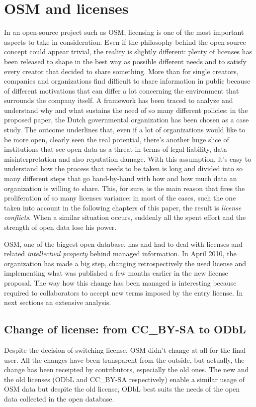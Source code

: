 \section{OSM and licenses}
In an open-source project such as OSM, licensing is one of the most important aspects to take in consideration.
Even if the philosophy behind the open-source concept could appear trivial, the reality is slightly different: plenty of licenses has been released to shape in the best way as possible different needs and to satisfy every creator that decided to share something.
More than for single creators, companies and organizations find difficult to share information in public because of different motivations that can differ a lot concerning the environment that surrounds the company itself.
A framework has been traced to analyze and understand why and what sustains the need of so many different policies: in the proposed paper\cite{zuiderwijk2014open}, the Dutch governmental organization has been chosen as a case study.
The outcome underlines that, even if a lot of organizations would like to be more open, clearly seen the real potential, there's another huge slice of institutions that see open data as a threat in terms of legal liability, data misinterpretation and also reputation damage.
With this assumption, it's easy to understand how the process that needs to be taken is long and divided into so many different steps that go hand-by-hand with how and how much data an organization is willing to share.
This, for sure, is the main reason that fires the proliferation of so many licenses variance: in most of the cases, such the one taken into account in the following chapters of this paper, the result is \textit{license conflicts}. When a similar situation occurs, suddenly all the spent effort and the strength of open data lose his power.

OSM, one of the biggest open database, has and had to deal with licenses and related \textit{intellectual property} behind managed information. In April 2010, the organization has made a big step, changing retrospectively the used license and implementing what was published a few months earlier in the new license proposal\cite{amos2009new}. The way how this change has been managed is interesting because required to collaborators to accept new terms imposed by the entry license. In next sections an extensive analysis.

\subsection{Change of license: from CC\_BY-SA to ODbL}\label{sec:licensechange}
Despite the decision of switching license, OSM didn't change at all for the final user. All the changes have been transparent from the outside, but actually, the change has been receipted by contributors, especially the old ones.
The new and the old licenses (ODbL and CC\_BY-SA respectively) enable a similar usage of OSM data but despite the old license,
ODbL best suits the needs of the open data collected in the open database.

